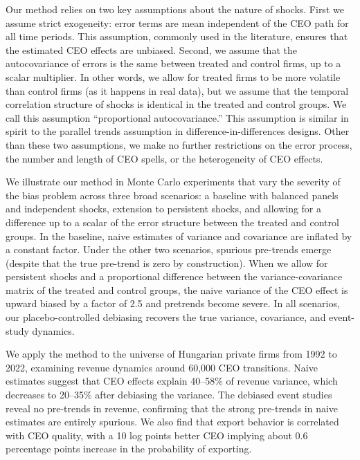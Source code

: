 \documentclass[11pt,a4paper]{article}
\begin{document}
Our method relies on two key assumptions about the nature of shocks. First we assume strict exogeneity: error terms are mean independent of the CEO path for all time periods. This assumption, commonly used in the literature, ensures that the estimated CEO effects are unbiased. Second, we assume that the autocovariance of errors is the same between treated and control firms, up to a scalar multiplier. In other words, we allow for treated firms to be more volatile than control firms (as it happens in real data), but we assume that the temporal correlation structure of shocks is identical in the treated and control groups. We call this assumption ``proportional autocovariance.'' This assumption is similar in spirit to the parallel trends assumption in difference-in-differences designs. Other than these two assumptions, we make no further restrictions on the error process, the number and length of CEO spells, or the heterogeneity of CEO effects. 

We illustrate our method in Monte Carlo experiments that vary the severity of the bias problem across three broad scenarios: a baseline with balanced panels and independent shocks, extension to persistent shocks, and allowing for a difference up to a scalar of the error structure between the treated and control groups. In the baseline, naive estimates of variance and covariance are inflated by a constant factor. Under the other two scenarios, spurious pre-trends emerge (despite that the true pre-trend is zero by construction). When we allow for persistent shocks and a proportional difference between the variance-covariance matrix of the treated and control groups, the naive variance of the CEO effect is upward biased by a factor of 2.5 and pretrends become severe. In all scenarios, our placebo-controlled debiasing recovers the true variance, covariance, and event-study dynamics.

We apply the method to the universe of Hungarian private firms from 1992 to 2022, examining revenue dynamics around 60,000 CEO transitions. Naive estimates suggest that CEO effects explain 40--58\% of revenue variance, which decreases to 20--35\% after debiasing the variance. The debiased event studies reveal no pre-trends in revenue, confirming that the strong pre-trends in naive estimates are entirely spurious. We also find that export behavior is correlated with CEO quality, with a 10 log points better CEO implying about 0.6 percentage points increase in the probability of exporting.

\end{document}
